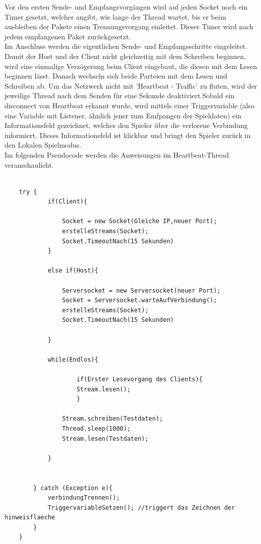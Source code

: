 \documentclass[12pt,a4paper]{article}
\begin{document}
{Vor den ersten Sende- und Empfangsvorgängen wird auf jeden Socket noch ein Timer gesetzt, welcher angibt, wie lange der Thread wartet, bis er beim ausbleiben der Pakete einen Trennungsvorgang einleitet. Dieser Timer wird nach jedem empfangenen Paket zurückgesetzt.\\
Im Anschluss werden die eigentlichen Sende- und Empfangsschritte eingeleitet. Damit der Host und der Client nicht gleichzeitig mit dem Schreiben beginnen, wird eine einmalige Verzögerung beim Client eingebaut, die diesen mit dem Lesen beginnen lässt. Danach wechseln sich beide Parteien mit dem Lesen und Schreiben ab. Um das Netzwerk nicht mit 'Heartbeat - Traffic' zu fluten, wird der jeweilige Thread nach dem Senden für eine Sekunde deaktiviert.Sobald ein disconnect von Heartbeat erkannt wurde, wird mittels einer Triggervariable (also eine Variable mit Listener, ähnlich jener zum Emfpangen der Spieldaten) ein Informationsfeld gezeichnet, welches den Spieler über die verlorene Verbindung informiert. Dieses Informationsfeld ist klickbar und bringt den Spieler zurück in den Lokalen Spielmodus.\\[2ex]
Im folgenden Pseudocode werden die Anweisungen im Heartbeat-Thread veranschaulicht.

\lstset{language=java}
\begin{lstlisting}

	try {
			if(Client){
	
				Socket = new Socket(Gleiche IP,neuer Port);
				erstelleStreams(Socket);
				Socket.TimeoutNach(15 Sekunden)
			}

			else if(Host){

				Serversocket = new Serversocket(neuer Port);
				Socket = Serversocket.warteAufVerbindung();
				erstelleStreams(Socket);
				Socket.TimeoutNach(15 Sekunden)

			}
			
			while(Endlos){

					if(Erster Lesevorgang des Clients){					
					Stream.lesen();
					}

				Stream.schreiben(Testdaten);
				Thread.sleep(1000);
				Stream.lesen(Testdaten);

			}


		} catch (Exception e){
			verbindungTrennen();
			TriggervariableSetzen(); //triggert das Zeichnen der hinweisflaeche
		}
	}
\end{lstlisting}



\newpage

}
\end{document}
